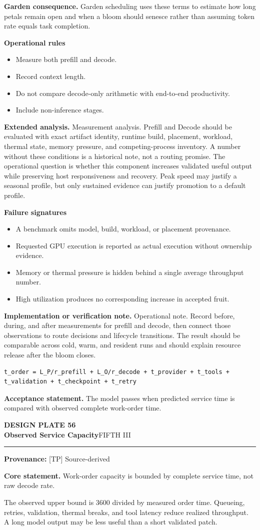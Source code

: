 \documentclass[10pt,letterpaper,oneside]{article}
\newcommand{\prov}[1]{\textcolor{gardenBlue}{\sffamily\footnotesize\textbf{Provenance:} #1}}
\newcommand{\platetitle}[3]{%
  \begin{minipage}[t][0.54in][t]{\textwidth}
  {\sffamily\bfseries\color{gardenDeep}\fontsize{9}{10}\selectfont DESIGN PLATE #1}\\[-1pt]
  {\sffamily\bfseries\color{gardenInk}\fontsize{16.5}{18}\selectfont #2}\hfill{\sffamily\color{gardenGreen}\large #3}
  \end{minipage}\vspace{-2pt}\hrule\vspace{5pt}}
\begin{document}
\textbf{Garden consequence.} Garden scheduling uses these terms to estimate how long petals remain open and when a bloom should senesce rather than assuming token rate equals task completion.

\textbf{Operational rules}
\begin{itemize}
\item Measure both prefill and decode.
\item Record context length.
\item Do not compare decode-only arithmetic with end-to-end productivity.
\item Include non-inference stages.
\end{itemize}
\textbf{Extended analysis.} Measurement analysis. Prefill and Decode should be evaluated with exact artifact identity, runtime build, placement, workload, thermal state, memory pressure, and competing-process inventory. A number without these conditions is a historical note, not a routing promise. The operational question is whether this component increases validated useful output while preserving host responsiveness and recovery. Peak speed may justify a seasonal profile, but only sustained evidence can justify promotion to a default profile.

\textbf{Failure signatures}
\begin{itemize}
\item A benchmark omits model, build, workload, or placement provenance.
\item Requested GPU execution is reported as actual execution without ownership evidence.
\item Memory or thermal pressure is hidden behind a single average throughput number.
\item High utilization produces no corresponding increase in accepted fruit.
\end{itemize}
\textbf{Implementation or verification note.} Operational note. Record before, during, and after measurements for prefill and decode, then connect those observations to route decisions and lifecycle transitions. The result should be comparable across cold, warm, and resident runs and should explain resource release after the bloom closes.

\begin{lstlisting}
t_order = L_P/r_prefill + L_O/r_decode + t_provider + t_tools + t_validation + t_checkpoint + t_retry
\end{lstlisting}
\begin{acceptbox}
\textbf{Acceptance statement.} The model passes when predicted service time is compared with observed complete work-order time.
\end{acceptbox}
\newpage
\platetitle{56}{Observed Service Capacity}{FIFTH III}
\prov{[TP] Source-derived}
\fontsize{8.85}{10.45}\selectfont
\begin{corebox}
\textbf{Core statement.} Work-order capacity is bounded by complete service time, not raw decode rate.
\end{corebox}
The observed upper bound is 3600 divided by measured order time. Queueing, retries, validation, thermal breaks, and tool latency reduce realized throughput. A long model output may be less useful than a short validated patch.
\end{document}
